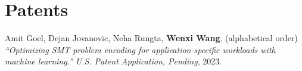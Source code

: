 \section{Patents}
\vspace{-3ex}




\renewcommand{\refname}{\vspace{-1cm}}

\begin{thebibliography}{99} %
	
	Amit Goel, Dejan Jovanovic, Neha Rungta, \textbf{Wenxi Wang}. (alphabetical order)
		\emph{``Optimizing SMT problem encoding for application-specific workloads with machine learning.''}
		\textit{U.S. Patent Application, Pending}, 2023. 
	
	
\end{thebibliography}



